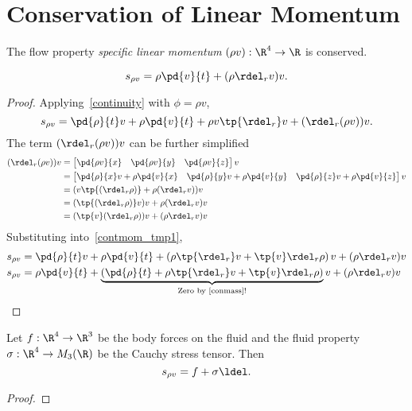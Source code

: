 \section{Conservation of Linear Momentum}
\begin{df}
    The flow property \emph{specific linear momentum} $(\rho v):\R^4\to \R$ is conserved.
\end{df}
\begin{thm}
    \begin{equation}
        s_{\rho v} = \rho \pd{v}{t} + ( \rho \rdel_r v ) v.
    \end{equation}
\end{thm}
\begin{proof}
    Applying~\autoref{continuity} with $\phi=\rho v$,
    \begin{equation}
        \label{contmom_tmp1}
        s_{\rho v} = \pd{\rho}{t}v + \rho \pd{v}{t}  + \rho v \tp{\rdel_r} v  + (\rdel_r(\rho v)) v.
    \end{equation}
    The term $(\rdel_r (\rho v))v$ can be further simplified
    \begin{align}
        (\rdel_r (\rho v))v &= \begin{bmatrix}
            \pd{\rho v}{x} & \pd{\rho v}{y} & \pd{\rho v}{z}
        \end{bmatrix} v \\
        &= \begin{bmatrix}
            \pd{\rho}{x} v + \rho \pd{v}{x} & \pd{\rho}{y} v + \rho \pd{v}{y} & \pd{\rho}{z} v + \rho \pd{v}{z}
        \end{bmatrix} v \\
        &= (v\tp{(\rdel_r\rho)} + \rho (\rdel_r v)) v \\
        &= (\tp{(\rdel_r\rho)}v)v + \rho (\rdel_r v) v \\
        &= (\tp{v}(\rdel_r\rho))v + (\rho \rdel_r v) v
    \end{align}
    Substituting into~\autoref{contmom_tmp1},
    \begin{align}
        s_{\rho v} &= \pd{\rho}{t}v + \rho \pd{v}{t}  + \left(\rho \tp{\rdel_r} v + \tp{v} \rdel_r \rho \right) v  + ( \rho \rdel_r v ) v \\
        s_{\rho v} &= \rho \pd{v}{t}  + \underbrace{\left(\pd{\rho}{t} + \rho \tp{\rdel_r} v + \tp{v} \rdel_r \rho \right)}_{\text{Zero by~\autoref{conmass}!}} v  + ( \rho \rdel_r v ) v
    \end{align}
\end{proof}
\begin{thm}
    Let $f:\R^4\to \R^3$ be the body forces on the fluid and the fluid property
    $\sigma: \R^4\to M_3(\R)$ be the Cauchy stress tensor.  Then
    \begin{equation}
        s_{\rho v} = f + \sigma \ldel.
    \end{equation}
\end{thm}
\begin{proof}

\end{proof}
